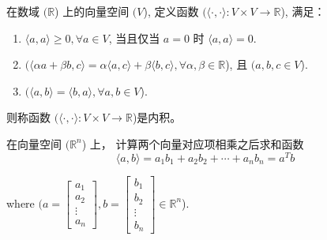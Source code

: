 \begin{definition}[内积]
    在数域 $( \mathbb{R} $) 上的向量空间 $( V $), 定义函数 $( \langle\cdot,\cdot\rangle:V \times V \rightarrow \mathbb{R} $), 满足：

    \begin{enumerate}
        \item $ \langle{a}, {a}\rangle \geq 0, \forall {a} \in V $, 当且仅当 $a=0$ 时 $ \langle a, a\rangle=0 $.
        \item $( \langle\alpha {a}+\beta {b}, c\rangle=\alpha\langle{a}, c\rangle+\beta\langle{b}, c\rangle, \forall \alpha, \beta \in \mathbb{R} $), 且 $( {a}, {b}, c \in V $).
        \item $( \langle{a}, {b}\rangle=\langle{b}, {a}\rangle, \forall {a}, {b} \in V $).
    \end{enumerate}

    则称函数 $( \langle\cdot,\cdot\rangle:V \times V \rightarrow \mathbb{R} $)是内积。 
\end{definition}

\begin{example}
    在向量空间 $( \mathbb{R}^{n} $) 上，  计算两个向量对应项相乘之后求和函数
    \begin{equation} \langle a, b\rangle=a_{1} b_{1}+a_{2} b_{2}+\cdots+a_{n} b_{n}=a^{T}{b} \end{equation}

where $( a=\left[\begin{array}{c}a_{1} \\ a_{2} \\ \vdots \\ a_{n}\end{array}\right], b=\left[\begin{array}{c}b_{1} \\ b_{2} \\ \vdots \\ b_{n}\end{array}\right] \in \mathbb{R}^{n} $).
\end{example}

